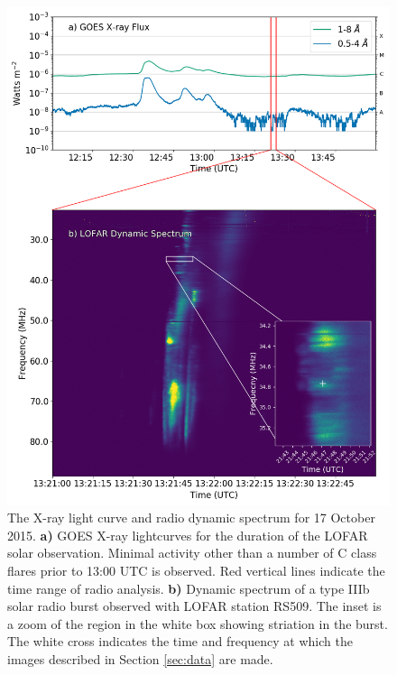 \begin{figure}
    \centering
    \includegraphics[width=\columnwidth]{Images/Burst_inset_goes_20200730.png}
    \caption[GOES X-ray lightcurves and dynamic spectrum for the duration of a LOFAR solar observation 17 October 2015.]{The X-ray light curve and radio dynamic spectrum for 17 October 2015. \textbf{a)} GOES X-ray lightcurves for the duration of the LOFAR solar observation. Minimal activity other than a number of C class flares prior to 13:00 UTC is observed. Red vertical lines indicate the time range of radio analysis. \textbf{b)} Dynamic spectrum of a type IIIb solar radio burst observed with LOFAR station RS509. The inset is a zoom of the region in the white box showing striation in the burst. The white cross indicates the time and frequency at which the images described in Section \ref{sec:data} are made.}
    \label{fig:context}
\end{figure}

